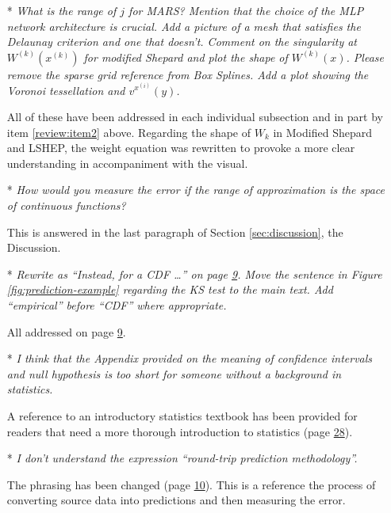 \begin{itemize}[leftmargin=.5cm]
\item[*] {\it What is the range of $j$ for MARS? Mention that the choice of the MLP network architecture is crucial. Add a picture of a mesh that satisfies the Delaunay criterion and one that doesn’t. Comment on the singularity at $W^{(k)}(x^{(k)})$ for modified Shepard and plot the shape of $W^{(k)}(x)$. Please remove the sparse grid reference from Box Splines. Add a plot showing the Voronoi tessellation and $v^{x^{(i)}}(y)$.}\vspace{.2cm}

All of these have been addressed in each individual subsection and in part by item \ref{review:item2} above. Regarding the shape of $W_k$ in Modified Shepard and LSHEP, the weight equation was rewritten to provoke a more clear understanding in accompaniment with the visual.

\item[*] {\it How would you measure the error if the range of approximation is the space of continuous functions?}\vspace{.2cm}

This is answered in the last paragraph of Section \ref{sec:discussion}, the Discussion.

\item[*] {\it Rewrite as ``Instead, for a CDF \ldots'' on page \hyperlink{page.9}{9}. Move the sentence in Figure \ref{fig:prediction-example} regarding the KS test to the main text. Add ``empirical'' before ``CDF'' where appropriate.}\vspace{.2cm}

All addressed on page \hyperlink{page.9}{9}.

\item[*] {\it I think that the Appendix provided on the meaning of confidence intervals and null hypothesis is too short for someone without a background in statistics.}\vspace{.2cm}

A reference to an introductory statistics textbook has been provided for readers that need a more thorough introduction to statistics (page \hyperlink{page.28}{28}).

\item[*] {\it I don’t understand the expression “round-trip prediction methodology”.}\vspace{.2cm}

The phrasing has been changed (page \hyperlink{page.10}{10}). This is a reference the process of converting source data into predictions and then measuring the error.


\end{itemize}

